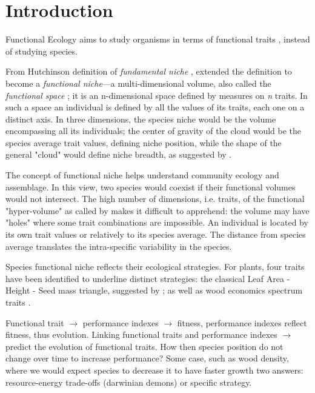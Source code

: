 \label{sec:Intro}
\section*{Introduction}
Functional Ecology aims to study organisms in terms of functional traits \cite{NEEDED}, instead of studying species.

From Hutchinson definition of \emph{fundamental niche} \citep{hutchinson_concluding_1957}, \citet{violle_towards_2009} extended the definition to become a \emph{functional niche}—a multi-dimensional volume, also called the \emph{functional space} ; it is an n-dimensional space defined by measures on \emph{n} traits. In such a space an individual is defined by all the values of its traits, each one on a distinct axis. In three dimensions, the species niche would be the volume encompassing all its individuals; the center of gravity of the cloud would be the species average trait values, defining niche position, while the shape of the general "cloud" would define niche breadth, as suggested by \citet{violle_towards_2009}.

The concept of functional niche helps understand community ecology and assemblage. In this view, two species would coexist if their functional volumes would not intersect. The high number of dimensions, i.e. traits, of the functional "hyper-volume" as called by \cite{NEEDED} makes it difficult to apprehend: the volume may have "holes" where some trait combinations are impossible. An individual is located by its own trait values or relatively to its species average. The distance from species average translates the intra-specific variability in the species.

Species functional niche reflects their ecological strategies. For plants, four traits have been identified to underline distinct strategies: the classical Leaf Area - Height - Seed mass triangle, suggested by \cite{NEEDED}; as well as wood economics spectrum traits \citep{baraloto_functional_2010}.

Functional trait $\rightarrow$ performance indexes $\rightarrow$ fitness, performance indexes reflect fitness, thus evolution. Linking functional traits and performance indexes $\rightarrow$ predict the evolution of functional traits. How then species position do not change over time to increase performance? Some case, such as wood density, where we would expect species to decrease it to have faster growth two answers: resource-energy trade-offs (darwinian demons) or specific strategy. 

